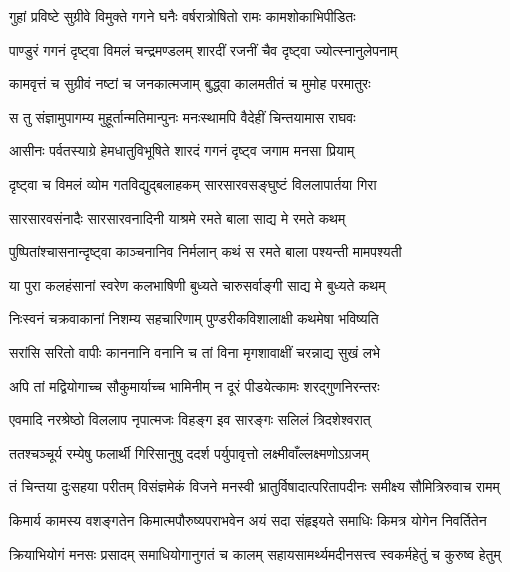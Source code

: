 \twolineshloka
{गुहां प्रविष्टे सुग्रीवे विमुक्ते गगने घनैः}
{वर्षरात्रोषितो रामः कामशोकाभिपीडितः} %

\twolineshloka
{पाण्डुरं गगनं दृष्ट्वा विमलं चन्द्रमण्डलम्}
{शारदीं रजनीं चैव दृष्ट्वा ज्योत्स्नानुलेपनाम्} %

\twolineshloka
{कामवृत्तं च सुग्रीवं नष्टां च जनकात्मजाम्}
{बुद्ध्वा कालमतीतं च मुमोह परमातुरः} %

\twolineshloka
{स तु संज्ञामुपागम्य मुहूर्तान्मतिमान्पुनः}
{मनःस्थामपि वैदेहीं चिन्तयामास राघवः} %

\twolineshloka
{आसीनः पर्वतस्याग्रे हेमधातुविभूषिते}
{शारदं गगनं दृष्ट्व जगाम मनसा प्रियाम्} %

\twolineshloka
{दृष्ट्वा च विमलं व्योम गतविद्युद्बलाहकम्}
{सारसारवसङ्घुष्टं विललापार्तया गिरा} %

\twolineshloka
{सारसारवसंनादैः सारसारवनादिनी}
{याश्रमे रमते बाला साद्य मे रमते कथम्} %

\twolineshloka
{पुष्पितांश्चासनान्दृष्ट्वा काञ्चनानिव निर्मलान्}
{कथं स रमते बाला पश्यन्ती मामपश्यती} %

\twolineshloka
{या पुरा कलहंसानां स्वरेण कलभाषिणी}
{बुध्यते चारुसर्वाङ्गी साद्य मे बुध्यते कथम्} %

\twolineshloka
{निःस्वनं चक्रवाकानां निशम्य सहचारिणाम्}
{पुण्डरीकविशालाक्षी कथमेषा भविष्यति} %

\twolineshloka
{सरांसि सरितो वापीः काननानि वनानि च}
{तां विना मृगशावाक्षीं चरन्नाद्य सुखं लभे} %

\twolineshloka
{अपि तां मद्वियोगाच्च सौकुमार्याच्च भामिनीम्}
{न दूरं पीडयेत्कामः शरद्गुणनिरन्तरः} %

\twolineshloka
{एवमादि नरश्रेष्ठो विललाप नृपात्मजः}
{विहङ्ग इव सारङ्गः सलिलं त्रिदशेश्वरात्} %

\twolineshloka
{ततश्चञ्चूर्य रम्येषु फलार्थी गिरिसानुषु}
{ददर्श पर्युपावृत्तो लक्ष्मीवाँल्लक्ष्मणोऽग्रजम्} %

\fourlineindentedshloka
{तं चिन्तया दुःसहया परीतम्}
{विसंज्ञमेकं विजने मनस्वी}
{भ्रातुर्विषादात्परितापदीनः}
{समीक्ष्य सौमित्रिरुवाच रामम्} %

\fourlineindentedshloka
{किमार्य कामस्य वशङ्गतेन}
{किमात्मपौरुष्यपराभवेन}
{अयं सदा संहृइयते समाधिः}
{किमत्र योगेन निवर्तितेन} %

\fourlineindentedshloka
{क्रियाभियोगं मनसः प्रसादम्}
{समाधियोगानुगतं च कालम्}
{सहायसामर्थ्यमदीनसत्त्व}
{स्वकर्महेतुं च कुरुष्व हेतुम्} %

